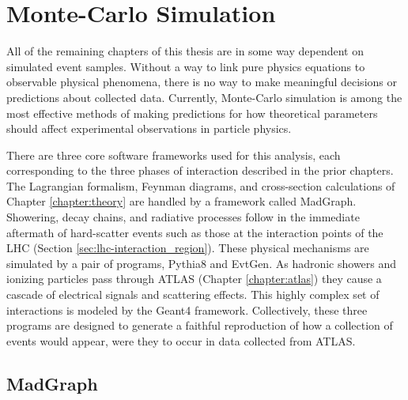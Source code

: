 \section{Monte-Carlo Simulation} \label{sec:mcsim}
    
    All of the remaining chapters of this thesis are in some way dependent on simulated event samples.
    Without a way to link pure physics equations to observable physical phenomena,
        there is no way to make meaningful decisions or predictions about collected data.
    Currently, Monte-Carlo simulation\cite{montecarlo} is among the most effective methods of making predictions
        for how theoretical parameters should affect experimental observations in particle physics\cite{compphys}.

    There are three core software frameworks used for this analysis,
        each corresponding to the three phases of interaction described in the prior chapters.
    The Lagrangian formalism, Feynman diagrams, and cross-section calculations of Chapter \ref{chapter:theory}
        are handled by a framework called MadGraph\cite{madgraph}.
    Showering, decay chains, and radiative processes follow in the immediate aftermath of
        hard-scatter events such as those at the interaction points of the LHC (Section \ref{sec:lhc-interaction_region}).
    These physical mechanisms are simulated by a pair of programs, Pythia8\cite{pythia} and EvtGen\cite{EvtGen}.
    As hadronic showers and ionizing particles pass through ATLAS (Chapter \ref{chapter:atlas})
        they cause a cascade of electrical signals and scattering effects.
    This highly complex set of interactions is modeled by the Geant4 framework\cite{geant4}.
    Collectively, these three programs are designed to
        generate a faithful reproduction of how a collection of \vbfhhproc events would appear,
        were they to occur in data collected from ATLAS.


    \subsection{MadGraph}

